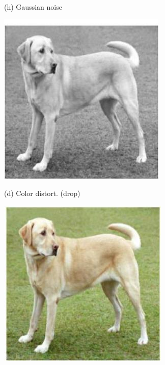 \documentclass[10pt]{article}
\begin{document}
(h) Gaussian noise

\begin{center}
\includegraphics[max width=\textwidth]{2024_01_08_7c14f4867d7823fc5a52g-14(5)}
\end{center}

(d) Color distort. (drop)

\begin{center}
\includegraphics[max width=\textwidth]{2024_01_08_7c14f4867d7823fc5a52g-14(6)}
\end{center}
\end{document}
